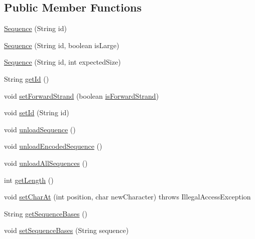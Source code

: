 \subsection*{Public Member Functions}
\begin{DoxyCompactItemize}
\item 
\hyperlink{classbroad_1_1core_1_1sequence_1_1_sequence_a3f5ed7a6ae3513ae7eb2bae8789a6f10}{Sequence} (String id)
\item 
\hyperlink{classbroad_1_1core_1_1sequence_1_1_sequence_a033dc095af9d8335f3818b72e65e3ecc}{Sequence} (String id, boolean is\+Large)
\item 
\hyperlink{classbroad_1_1core_1_1sequence_1_1_sequence_a0f8c3850c9c8fe80c2b9220ba7618ebe}{Sequence} (String id, int expected\+Size)
\item 
String \hyperlink{classbroad_1_1core_1_1sequence_1_1_sequence_a5da71f38ac38e891746b5f747fe67213}{get\+Id} ()
\item 
void \hyperlink{classbroad_1_1core_1_1sequence_1_1_sequence_a1126c1510a531a59949482357696d37b}{set\+Forward\+Strand} (boolean \hyperlink{classbroad_1_1core_1_1sequence_1_1_sequence_ad3843c99ca1bdd29ff3a8d054c2714fc}{is\+Forward\+Strand})
\item 
void \hyperlink{classbroad_1_1core_1_1sequence_1_1_sequence_a22ed5d4080bf7946a0d0a782f792e945}{set\+Id} (String id)
\item 
void \hyperlink{classbroad_1_1core_1_1sequence_1_1_sequence_ac9da439ccb0a9eb4e8d2d514551c92fd}{unload\+Sequence} ()
\item 
void \hyperlink{classbroad_1_1core_1_1sequence_1_1_sequence_accc6ee68ddb6acad2a0f5443c47d3b2d}{unload\+Encoded\+Sequence} ()
\item 
void \hyperlink{classbroad_1_1core_1_1sequence_1_1_sequence_afb2eb45f529388053380969eda3f7993}{unload\+All\+Sequences} ()
\item 
int \hyperlink{classbroad_1_1core_1_1sequence_1_1_sequence_ae1f565eae2b5a441424f232711a1da9b}{get\+Length} ()
\item 
void \hyperlink{classbroad_1_1core_1_1sequence_1_1_sequence_a9d8bf6ecc44a74ff02c8811f29f670ec}{set\+Char\+At} (int position, char new\+Character)  throws Illegal\+Access\+Exception 
\item 
String \hyperlink{classbroad_1_1core_1_1sequence_1_1_sequence_a416d299b6cd3017e291847079c55380f}{get\+Sequence\+Bases} ()
\item 
void \hyperlink{classbroad_1_1core_1_1sequence_1_1_sequence_a8195f46d431993392dbb892bb85beca1}{set\+Sequence\+Bases} (String sequence)

\end{DoxyCompactItemize}
